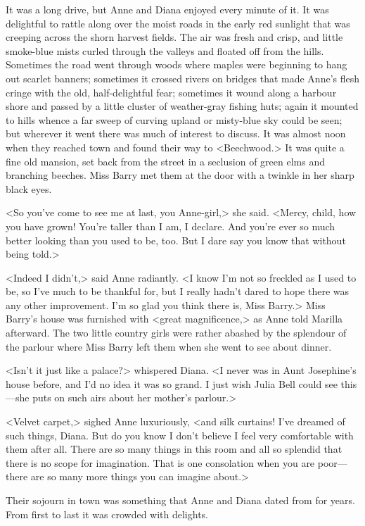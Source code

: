 It was a long drive, but Anne and Diana enjoyed every minute of it. It was delightful to rattle along over the moist roads in the early red sunlight that was creeping across the shorn harvest fields. The air was fresh and crisp, and little smoke-blue mists curled through the valleys and floated off from the hills. Sometimes the road went through woods where maples were beginning to hang out scarlet banners; sometimes it crossed rivers on bridges that made Anne's flesh cringe with the old, half-delightful fear; sometimes it wound along a harbour shore and passed by a little cluster of weather-gray fishing huts; again it mounted to hills whence a far sweep of curving upland or misty-blue sky could be seen; but wherever it went there was much of interest to discuss. It was almost noon when they reached town and found their way to <Beechwood.> It was quite a fine old mansion, set back from the street in a seclusion of green elms and branching beeches. Miss Barry met them at the door with a twinkle in her sharp black eyes.

<So you've come to see me at last, you Anne-girl,> she said. <Mercy, child, how you have grown! You're taller than I am, I declare. And you're ever so much better looking than you used to be, too. But I dare say you know that without being told.>

<Indeed I didn't,> said Anne radiantly. <I know I'm not so freckled as I used to be, so I've much to be thankful for, but I really hadn't dared to hope there was any other improvement. I'm so glad you think there is, Miss Barry.> Miss Barry's house was furnished with <great magnificence,> as Anne told Marilla afterward. The two little country girls were rather abashed by the splendour of the parlour where Miss Barry left them when she went to see about dinner.

<Isn't it just like a palace?> whispered Diana. <I never was in Aunt Josephine's house before, and I'd no idea it was so grand. I just wish Julia Bell could see this—she puts on such airs about her mother's parlour.>

<Velvet carpet,> sighed Anne luxuriously, <and silk curtains! I've dreamed of such things, Diana. But do you know I don't believe I feel very comfortable with them after all. There are so many things in this room and all so splendid that there is no scope for imagination. That is one consolation when you are poor—there are so many more things you can imagine about.>

Their sojourn in town was something that Anne and Diana dated from for years. From first to last it was crowded with delights.

